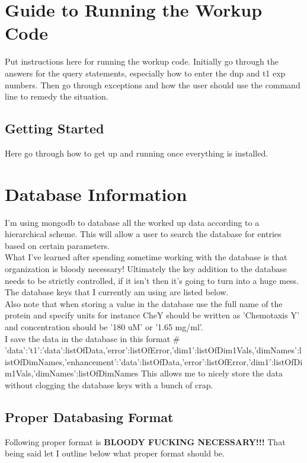 \documentclass[10pt]{book}
\begin{document}
\chapter{Guide to Running the Workup Code}
Put instructions here for running the workup code. Initially go through the answers for the query statements, especially how to enter the dnp and t1 exp numbers. Then go through exceptions and how the user should use the command line to remedy the situation.

\section{Getting Started}
Here go through how to get up and running once everything is installed.

\chapter{Database Information}
I'm using mongodb to database all the worked up data according to a hierarchical scheme. This will allow a user to search the database for entries based on certain parameters. \\

What I've learned after spending sometime working with the database is that organization is bloody necessary! Ultimately the key addition to the database needs to be strictly controlled, if it isn't then it's going to turn into a huge mess. The database keys that I currently am using are listed below.\\

Also note that when storing a value in the database use the full name of the protein and specify units for instance CheY should be written as 'Chemotaxis Y' and concentration should be '180 uM' or '1.65 mg/ml'. \\

I save the data in the database in this format 
# {'data':{'t1':{'data':listOfData,'error':listOfError,'dim1':listOfDim1Vals,'dimNames':listOfDimNames},'enhancement':{'data':listOfData,'error':listOfError,'dim1':listOfDim1Vals,'dimNames':listOfDimNames}}}
This allows me to nicely store the data without clogging the database keys with a bunch of crap.

\section{Proper Databasing Format}
Following proper format is {\bf BLOODY FUCKING NECESSARY!!!} That being said let I outline below what proper format should be.
\end{document}
